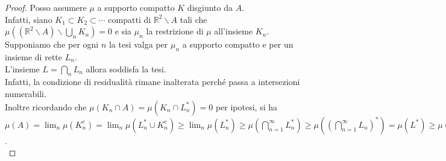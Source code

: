 \documentclass[a4paper, twoside,openright]{article}
\newcommand{\<}{\langle}
\renewcommand{\>}{\rangle}
\begin{document}
\begin{proof}
Posso assumere $\mu$ a supporto compatto $K$ disgiunto da $A$.\\
Infatti, siano $K_{1} \subset K_{2} \subset \cdots$ compatti di $\mathbb{R}^{2} \backslash A$ tali che $\mu\left(\left(\mathbb{R}^{2} \backslash A\right) \backslash \bigcup_{n} K_{n}\right)=0$ e sia $\mu_{n}$ la restrizione di $\mu$ all'insieme $K_{n}$. Supponiamo che per ogni $n$ la tesi valga per $\mu_n$ a supporto compatto e per un insieme di rette $L_n$.\\
L'insieme $L=\bigcap_n L_n$ allora soddisfa la tesi.\\
Infatti, la condizione di residualità rimane inalterata perché passa a intersezioni numerabili.\\
Inoltre ricordando che $\mu(K_n \cap A)=\mu(K_n \cap L_n^*)=0$ per ipotesi, si ha 
$\mu(A)=\lim_n\mu(K_n^c)=\lim_n\mu(L_n^* \cup K_n^c) \geq \lim_n \mu(L_n^*) \geq \mu\left(\bigcap_{n=1}^\infty L_n^*\right) \geq \mu\left(\left(\bigcap_{n=1}^\infty L_n\right)^*\right) = \mu(L^*) \geq \mu(A)$.\\


\end{proof}
\end{document}
